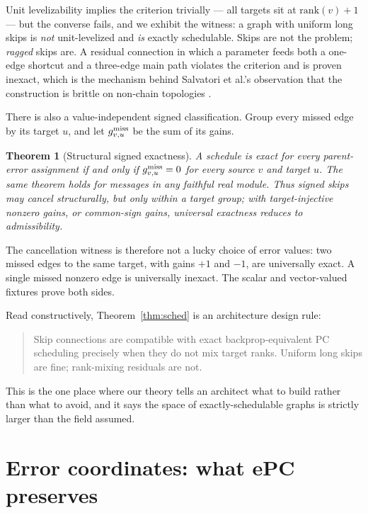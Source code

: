 \documentclass[11pt]{article}
\newtheorem{theorem}{Theorem}[section]
\begin{document}
Unit levelizability implies the criterion trivially --- all targets sit at
$\mathrm{rank}(v)+1$ --- but the converse fails, and we exhibit the witness: a graph with
uniform long skips is \emph{not} unit-levelized and \emph{is} exactly schedulable. Skips
are not the problem; \emph{ragged} skips are. A residual connection in which a parameter
feeds both a one-edge shortcut and a three-edge main path violates the criterion and is
proven inexact, which is the mechanism behind Salvatori et al.'s observation that the
construction is brittle on non-chain topologies \cite{salvatori2022}.

There is also a value-independent signed classification. Group every missed edge by its
target $u$, and let $g_{v,u}^{\rm miss}$ be the sum of its gains.

\begin{theorem}[Structural signed exactness]\label{thm:structsigned}
A schedule is exact for \emph{every} parent-error assignment if and only if
$g_{v,u}^{\rm miss}=0$ for every source $v$ and target $u$. The same theorem holds for
messages in any faithful real module. Thus signed skips may cancel structurally, but
only within a target group; with target-injective nonzero gains, or common-sign gains,
universal exactness reduces to admissibility.
\end{theorem}

The cancellation witness is therefore not a lucky choice of error values: two missed
edges to the same target, with gains $+1$ and $-1$, are universally exact. A single
missed nonzero edge is universally inexact. The scalar and vector-valued fixtures prove
both sides.

Read constructively, Theorem~\ref{thm:sched} is an architecture design rule:

\begin{quote}
Skip connections are compatible with exact backprop-equivalent PC scheduling precisely
when they do not mix target ranks. Uniform long skips are fine; rank-mixing residuals
are not.
\end{quote}

This is the one place where our theory tells an architect what to build rather than what
to avoid, and it says the space of exactly-schedulable graphs is strictly larger than
the field assumed.

\section{Error coordinates: what ePC preserves}
\label{sec:epc}
\end{document}
